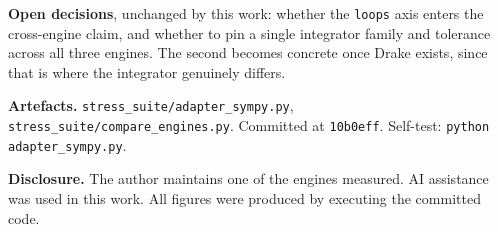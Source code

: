 \documentclass[11pt,a4paper]{article}
\newcommand{\gitsha}[1]{\texttt{#1}}
\begin{document}
\medskip
\noindent\textbf{Open decisions}, unchanged by this work: whether the
\texttt{loops} axis enters the cross-engine claim, and whether to pin a single
integrator family and tolerance across all three engines. The second becomes
concrete once Drake exists, since that is where the integrator genuinely
differs.

\medskip
\noindent\textbf{Artefacts.} \texttt{stress\_suite/adapter\_sympy.py},
\texttt{stress\_suite/compare\_engines.py}. Committed at \gitsha{10b0eff}.
Self-test: \texttt{python adapter\_sympy.py}.

\medskip
\noindent\textbf{Disclosure.} The author maintains one of the engines measured.
AI assistance was used in this work. All figures were produced by executing the
committed code.
\end{document}
